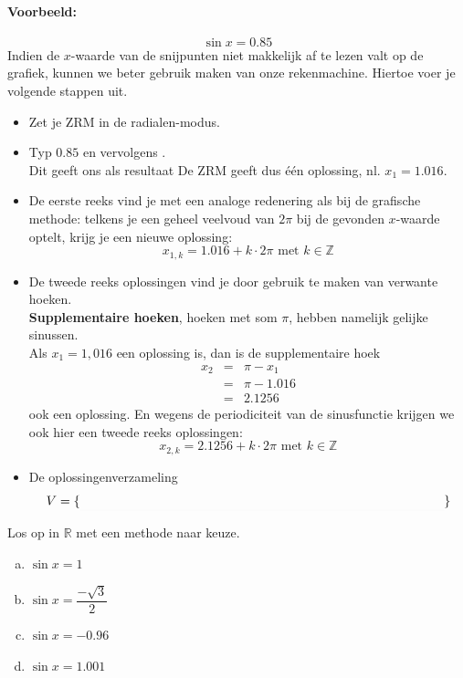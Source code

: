 \documentclass[a4paper,12pt]{article}
\begin{document}
\paragraph*{Voorbeeld:}
$$\sin x = 0.85$$
Indien de $x$-waarde van de snijpunten niet makkelijk af te lezen valt op de grafiek, kunnen we beter gebruik maken van onze rekenmachine.
Hiertoe voer je volgende stappen uit.
\begin{itemize}
  \item Zet je ZRM in de radialen-modus.
  \item Typ $0.85$ en vervolgens  .\\
  Dit geeft ons als resultaat \arulefill
  De ZRM geeft dus één oplossing, nl. $x_{1}=1.016$. 
  \item De eerste reeks vind je met een analoge redenering als bij de grafische methode: telkens je een geheel veelvoud van $2\pi$ bij de gevonden $x$-waarde optelt, krijg je een nieuwe oplossing:
  $$x_{1,k}=1.016+k\cdot2\pi \mbox{ met } k \in \mathbb{Z}$$
  \item De tweede reeks oplossingen vind je door gebruik te maken van verwante hoeken.\\
  {\bf Supplementaire hoeken}, hoeken met som $\pi$, hebben namelijk gelijke sinussen.\\
  Als $x_{1}=1,016$ een oplossing is, dan is de supplementaire hoek 
  \begin{eqnarray*}
  x_2 &=& \pi -x_{1}\\
      &=& \pi - 1.016\\
      &=& 2.1256
  \end{eqnarray*}
  ook een oplossing. En wegens de periodiciteit van de sinusfunctie krijgen we ook hier een tweede reeks oplossingen:
  $$x_{2,k} = 2.1256+k\cdot2\pi \mbox{ met } k \in \mathbb{Z}$$
  \item De oplossingenverzameling $$V = \{\arule{10cm}\}$$
\end{itemize}


\begin{oefening}
Los op in $\mathbb{R}$ met een methode naar keuze.
\begin{enumerate}[(a)]
  \item $\sin x=1$
  \item $\sin x=\dfrac{-\sqrt{3}}{2}$
  \item $\sin x=-0.96$
  \item $\sin x=1.001$
\end{enumerate}
\end{oefening}
\end{document}
